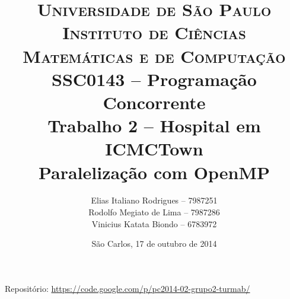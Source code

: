\begin{titlepage}

		\title{
\textsc {\large{Universidade de São Paulo\\
Instituto de Ciências Matemáticas e de Computação}}\\[1cm]
\large{SSC0143 -- Programação Concorrente}\\[5cm]
\LARGE{Trabalho 2 -- Hospital em ICMCTown}\\[0.5cm]
Paralelização com OpenMP\\[4cm]
		}

		\author{
Elias Italiano Rodrigues -- 7987251\\
Rodolfo Megiato de Lima -- 7987286\\
Vinicius Katata Biondo -- 6783972
		}

		\date{
\vfill São Carlos, 17 de outubro de 2014
		}

		\maketitle
Repositório: \url{https://code.google.com/p/pc2014-02-grupo2-turmab/}
		\thispagestyle{empty}

\end{titlepage}
